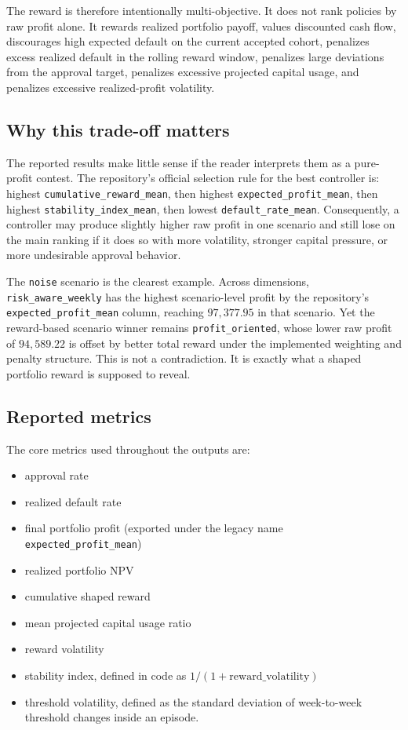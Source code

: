 \documentclass[12pt,a4paper]{article}
\begin{document}
The reward is therefore intentionally multi-objective. It does not rank policies by raw profit alone. It rewards realized portfolio payoff, values discounted cash flow, discourages high expected default on the current accepted cohort, penalizes excess realized default in the rolling reward window, penalizes large deviations from the approval target, penalizes excessive projected capital usage, and penalizes excessive realized-profit volatility.

\subsection{Why this trade-off matters}

The reported results make little sense if the reader interprets them as a pure-profit contest. The repository's official selection rule for the best controller is: highest \texttt{cumulative\_reward\_mean}, then highest \texttt{expected\_profit\_mean}, then highest \texttt{stability\_index\_mean}, then lowest \texttt{default\_rate\_mean}. Consequently, a controller may produce slightly higher raw profit in one scenario and still lose on the main ranking if it does so with more volatility, stronger capital pressure, or more undesirable approval behavior.

The \texttt{noise} scenario is the clearest example. Across dimensions, \texttt{risk\_aware\_weekly} has the highest scenario-level profit by the repository's \texttt{expected\_profit\_mean} column, reaching $97{,}377.95$ in that scenario. Yet the reward-based scenario winner remains \texttt{profit\_oriented}, whose lower raw profit of $94{,}589.22$ is offset by better total reward under the implemented weighting and penalty structure. This is not a contradiction. It is exactly what a shaped portfolio reward is supposed to reveal.

\subsection{Reported metrics}

The core metrics used throughout the outputs are:
\begin{itemize}[leftmargin=*]
    \item approval rate
    \item realized default rate
    \item final portfolio profit (exported under the legacy name \texttt{expected\_profit\_mean})
    \item realized portfolio NPV
    \item cumulative shaped reward
    \item mean projected capital usage ratio
    \item reward volatility
    \item stability index, defined in code as $1 / (1 + \mathrm{reward\_volatility})$
    \item threshold volatility, defined as the standard deviation of week-to-week threshold changes inside an episode.
\end{itemize}
\end{document}
